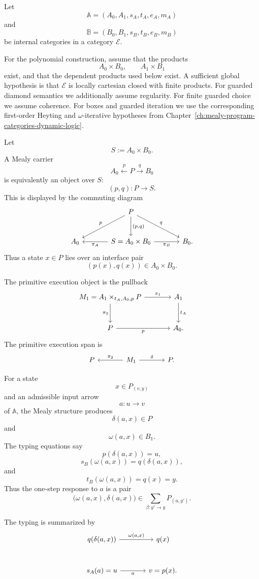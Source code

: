 Let
\[
\mathbb A=(A_0,A_1,s_A,t_A,e_A,m_A)
\]
and
\[
\mathbb B=(B_0,B_1,s_B,t_B,e_B,m_B)
\]
be internal categories in a category \(\mathcal E\).

For the polynomial construction, assume that the products
\[
A_0\times B_0,
\qquad
A_1\times B_1
\]
exist, and that the dependent products used below exist. A sufficient
global hypothesis is that \(\mathcal E\) is locally cartesian closed with
finite products. For guarded diamond semantics we additionally assume
regularity. For finite guarded choice we assume coherence. For boxes and
guarded iteration we use the corresponding first-order Heyting and
\(\omega\)-iterative hypotheses from
Chapter~\ref{ch:mealy-program-categories-dynamic-logic}.

Let
\[
S:=A_0\times B_0.
\]
A Mealy carrier
\[
A_0\xleftarrow{p}P\xrightarrow{q}B_0
\]
is equivalently an object over \(S\):
\[
(p,q):P\to S.
\]
This is displayed by the commuting diagram
\[
\begin{tikzcd}[column sep=large,row sep=large]
&
P
  \arrow[dl, "p"']
  \arrow[dr, "q"]
  \arrow[d, "{(p,q)}"]
&
\\
A_0
&
S=A_0\times B_0
  \arrow[l, "\pi_A"]
  \arrow[r, "\pi_B"']
&
B_0 .
\end{tikzcd}
\]
Thus a state \(x\in P\) lies over an interface pair
\[
(p(x),q(x))\in A_0\times B_0.
\]

The primitive execution object is the pullback
\[
\begin{tikzcd}[column sep=large,row sep=large]
M_1=A_1\times_{t_A,A_0,p}P
  \arrow[r, "\pi_1"]
  \arrow[d, "\pi_2"']
&
A_1
  \arrow[d, "t_A"]
\\
P
  \arrow[r, "p"']
&
A_0 .
\end{tikzcd}
\]
The primitive execution span is
\[
\begin{tikzcd}[column sep=large]
P
&
M_1
  \arrow[l, "\pi_2"']
  \arrow[r, "\delta"]
&
P .
\end{tikzcd}
\]

For a state
\[
x\in P_{(v,y)}
\]
and an admissible input arrow
\[
a:u\to v
\]
of \(\mathbb A\), the Mealy structure produces
\[
\delta(a,x)\in P
\]
and
\[
\omega(a,x)\in B_1.
\]
The typing equations say
\[
p(\delta(a,x))=u,
\]
\[
s_B(\omega(a,x))=q(\delta(a,x)),
\]
and
\[
t_B(\omega(a,x))=q(x)=y.
\]
Thus the one-step response to \(a\) is a pair
\[
\bigl(\omega(a,x),\delta(a,x)\bigr)
\in
\sum_{\beta:y'\to y}P_{(u,y')}.
\]

The typing is summarized by
\[
\begin{tikzcd}[column sep=large,row sep=large]
q(\delta(a,x))
  \arrow[r, "{\omega(a,x)}"]
&
q(x)
\\
s_A(a)=u
  \arrow[r, "a"']
&
v=p(x) .
\end{tikzcd}
\]


